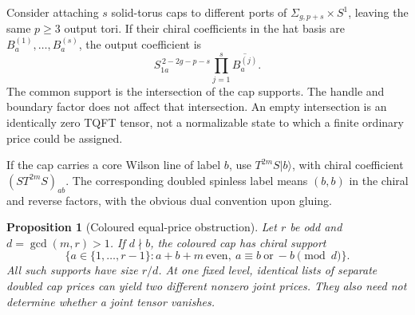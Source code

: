 \documentclass[11pt]{article}
\newtheorem{proposition}[theorem]{Proposition}
\theoremstyle{remark}
\newcommand{\ket}[1]{\lvert #1\rangle}
\newcommand{\Surf}[2]{\Sigma_{#1,#2}}
\begin{document}
Consider attaching \(s\) solid-torus caps to different ports of \(\Surf{g}{p+s}\times S^1\), leaving the same \(p\geq3\) output tori. If their chiral coefficients in the hat basis are \(B_a^{(1)},\ldots,B_a^{(s)}\), the output coefficient is
\begin{equation}\label{eq:sewing}
 S_{1a}^{\,2-2g-p-s}\prod_{j=1}^{s}\overline{B_a^{(j)}}.
\end{equation}
The common support is the intersection of the cap supports. The handle and boundary factor does not affect that intersection. An empty intersection is an identically zero TQFT tensor, not a normalizable state to which a finite ordinary price could be assigned.

If the cap carries a core Wilson line of label \(b\), use \(T^{2m}S\ket b\), with chiral coefficient \((S T^{2m} S)_{ab}\). The corresponding doubled spinless label means \((b,b)\) in the chiral and reverse factors, with the obvious dual convention upon gluing.
\begin{proposition}[Coloured equal-price obstruction]\label{prop:colored}
Let \(r\) be odd and \(d=\gcd(m,r)>1\). If \(d\nmid b\), the coloured cap has chiral support
\begin{equation}\label{eq:color}
 \bigl\{a\in\{1,\ldots,r-1\}:a+b+m\ \text{even},\
 a\equiv b\ \text{or}\ -b\pmod d\bigr\}.
\end{equation}
All such supports have size \(r/d\). At one fixed level, identical lists of separate doubled cap prices can yield two different \emph{nonzero} joint prices. They also need not determine whether a joint tensor vanishes.
\end{proposition}
\end{document}
